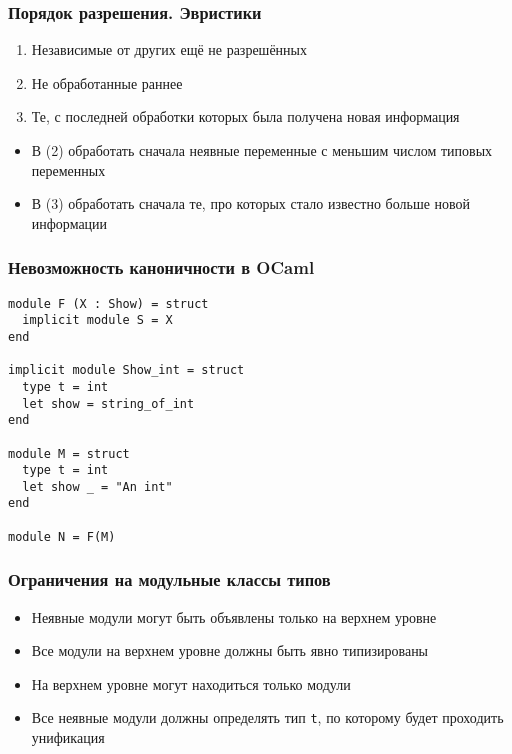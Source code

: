 \documentclass{beamer}
\newcommand{\backupend}{
   \addtocounter{framenumberappendix}{-\value{framenumber}}
   \addtocounter{framenumber}{\value{framenumberappendix}} 
}
\begin{document}
\lstset{language=caml}
\begin{frame}[fragile]\frametitle{Порядок разрешения. Эвристики}
\begin{enumerate}
    \item Независимые от других ещё не разрешённых
    \item Не обработанные раннее
    \item Те, с последней обработки которых была получена новая информация
  \end{enumerate}
\begin{itemize}
  \item В (2) обработать сначала неявные переменные с меньшим числом типовых переменных
  \item В (3) обработать сначала те, про которых стало известно больше новой информации
\end{itemize}
\end{frame}

\lstset{language=caml}
\begin{frame}[fragile]\frametitle{Невозможность каноничности в OCaml}
\begin{lstlisting}[style=base2]
module F (X : Show) = struct
  implicit module S = X
end

implicit module Show_int = struct
  type t = int
  let show = string_of_int
end

module M = struct
  type t = int
  let show _ = "An int"
end

module N = F(M)
\end{lstlisting}
\end{frame}


\begin{frame}\frametitle{Ограничения на модульные классы типов}
\begin{itemize}
  \item Неявные модули могут быть объявлены только на верхнем уровне
  \item Все модули на верхнем уровне должны быть явно типизированы
  \item На верхнем уровне могут находиться только модули
  \item Все неявные модули должны определять тип \texttt{t}, по которому будет проходить унификация 
\end{itemize}
\end{frame}


\backupend
\end{document}
